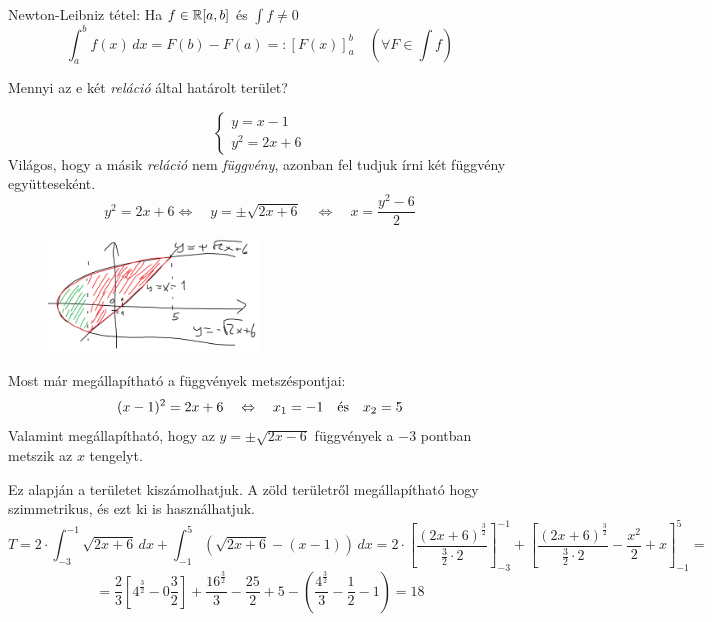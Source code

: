 \documentclass[a4paper,11.5pt]{article}
\begin{document}
		
	\begin{revision}
		Newton-Leibniz tétel: Ha $f\in\mathbb{R}[a,b]$ és $\int f\not=0$ 
			\[ \int_a^bf(x)\,dx=F(b)-F(a)=:[F(x)]_a^b\quad (\forall F\in\int f) \]
	\end{revision}
	\begin{example}
		Mennyi az e két \textit{reláció} által határolt terület?
			
		\[\begin{cases}
			y=x-1\\
			y^2=2x+6
		\end{cases}\]
		Világos, hogy a másik \textit{reláció} nem \textit{függvény}, azonban fel tudjuk írni két függvény együtteseként.
		\[y^2=2x+6\Leftrightarrow\quad y=\pm\sqrt{2x+6}\quad \Leftrightarrow\quad x=\frac{y^2-6}{2} \]
		\begin{figure}[H]
			\centering
			\includegraphics[height=3cm]{kepek/08.png}
			\caption{}
		\end{figure}
		Most már megállapítható a függvények metszéspontjai:
		\[ (x-1)^2=2x+6\quad \Leftrightarrow\quad x_1=-1\quad \text{és\quad } x_2=5 \]
		Valamint megállapítható, hogy az $y=\pm\sqrt{2x-6}$ függvények a $-3$ pontban metszik az $x$ tengelyt.
		\smallskip
		
		Ez alapján a területet kiszámolhatjuk. A zöld területről megállapítható hogy szimmetrikus, és ezt ki is használhatjuk.
		\[ T=2\cdot\int_{-3}^{-1}\sqrt{2x+6}\,dx+\int_{-1}^{5}\left(\sqrt{2x+6}-(x-1)\right)\,dx=2\cdot\left[\frac{(2x+6)^{\frac{3}{2}}}{\frac{3}{2}\cdot2}\right]_{-3}^{-1}+\left[\frac{(2x+6)^{\frac{3}{2}}}{\frac{3}{2}\cdot2}-\frac{x^2}{2}+x\right]^{5}_{-1}=\]
		\[=\frac{2}{3}\left[4^\frac{3}{2}-0\frac{3}{2}\right]+\frac{16^\frac{3}{2}}{3}-\frac{25}{2}+5-\left(\frac{4^\frac{3}{2}}{3}-\frac{1}{2}-1\right)=18  \]
	\end{example}
\end{document}
